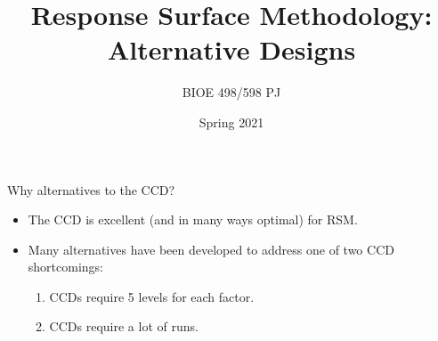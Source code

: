 \documentclass[9pt]{beamer}
\title{Response Surface Methodology:\\Alternative Designs}
\author{BIOE 498/598 PJ}
\date{Spring 2021}
\begin{document}
\frame{\titlepage}

\begin{frame}{Why alternatives to the CCD?}

\begin{itemize}
	\item The CCD is excellent (and in many ways optimal) for RSM.
	\item Many alternatives have been developed to address one of two CCD shortcomings:
	\begin{enumerate}
		\item CCDs require 5 levels for each factor.
		\item CCDs require a lot of runs.
	\end{enumerate}
\end{itemize}
	
\end{frame}
\end{document}
